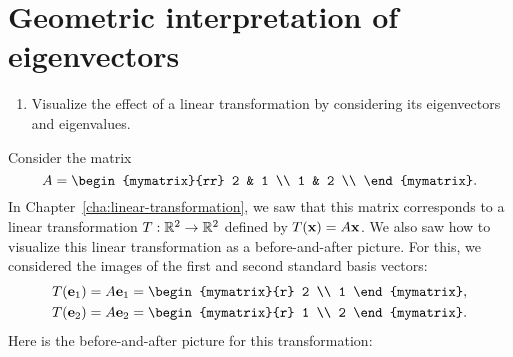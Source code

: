 \section{Geometric interpretation of eigenvectors}

\begin{outcome}
  \begin{enumerate}
  \item Visualize the effect of a linear transformation by
    considering its eigenvectors and eigenvalues.
  \end{enumerate}
\end{outcome}

Consider the matrix
\begin{equation*}
  A = \begin{mymatrix}{rr}
    2 & 1 \\
    1 & 2 \\
  \end{mymatrix}.
\end{equation*}
In Chapter~\ref{cha:linear-transformation}, we saw that this matrix
corresponds to a linear transformation $T : \mathbb{R}^2\to\mathbb{R}^2$ defined by
$T(\mbox{\bf x}) = A\mbox{\bf x}$. We also saw how to visualize this linear
transformation as a before-and-after picture. For this, we
considered the images of the first and second standard basis vectors:
\begin{align*}
  T(\vect{e}_1) &= A\vect{e}_1 = \begin{mymatrix}{r} 2 \\ 1 \end{mymatrix},\\
  T(\vect{e}_2) &= A\vect{e}_2 = \begin{mymatrix}{r} 1 \\ 2 \end{mymatrix}.
\end{align*}
Here is the before-and-after picture for this transformation:
\vspace{-2cm}
